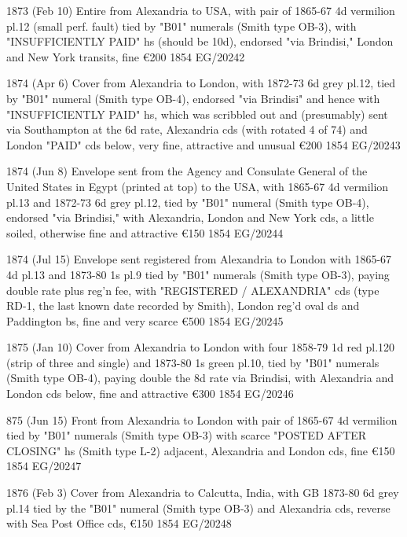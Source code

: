 \documentclass[justified]{tufte-book}
\begin{document}
%
{1873 (Feb 10) Entire from Alexandria to USA, with pair of 1865-67 4d vermilion pl.12 (small perf. fault) tied by "B01" numerals (Smith type OB-3), with "INSUFFICIENTLY PAID" hs (should be 10d), endorsed "via Brindisi," London and New York transits, fine \euro200
}
{1854}%
{EG/20242}%
{}%
{}
{}%
{}

%
{1874 (Apr 6) Cover from Alexandria to London, with 1872-73 6d grey pl.12, tied by "B01" numeral (Smith type OB-4), endorsed "via Brindisi" and hence with "INSUFFICIENTLY PAID" hs, which was scribbled out and (presumably) sent via Southampton at the 6d rate, Alexandria cds (with rotated 4 of 74) and London "PAID" cds below, very fine, attractive and unusual \euro200
}
{1854}%
{EG/20243}%
{}%
{}
{}%
{}

%
{1874 (Jun 8) Envelope sent from the Agency and Consulate General of the United States in Egypt (printed at top) to the USA, with 1865-67 4d vermilion pl.13 and 1872-73 6d grey pl.12, tied by "B01" numeral (Smith type OB-4), endorsed "via Brindisi," with Alexandria, London and New York cds, a little soiled, otherwise fine and attractive \euro150
}
{1854}%
{EG/20244}%
{}%
{}
{}%
{}

%
{1874 (Jul 15) Envelope sent registered from Alexandria to London with 1865-67 4d pl.13 and 1873-80 1s pl.9 tied by "B01" numerals (Smith type OB-3), paying double rate plus reg'n fee, with "REGISTERED / ALEXANDRIA" cds (type RD-1, the last known date recorded by Smith), London reg'd oval ds and Paddington bs, fine and very scarce \euro500
}
{1854}%
{EG/20245}%
{}%
{}
{}%
{}

%
{1875 (Jan 10) Cover from Alexandria to London with four 1858-79 1d red pl.120 (strip of three and single) and 1873-80 1s green pl.10, tied by "B01" numerals (Smith type OB-4), paying double the 8d rate via Brindisi, with Alexandria and London cds below, fine and attractive \euro300
}
{1854}%
{EG/20246}%
{}%
{}
{}%
{}

%
{875 (Jun 15) Front from Alexandria to London with pair of 1865-67 4d vermilion tied by "B01" numerals (Smith type OB-3) with scarce "POSTED AFTER CLOSING" hs (Smith type L-2) adjacent, Alexandria and London cds, fine \euro150
}
{1854}%
{EG/20247}%
{}%
{}
{}%
{}


%
{1876 (Feb 3) Cover from Alexandria to Calcutta, India, with GB 1873-80 6d grey pl.14 tied by the "B01" numeral (Smith type OB-3) and Alexandria cds, reverse with Sea Post Office cds, \euro150
}
{1854}%
{EG/20248}%
{}%
{}
{}%
{}
\end{document}
